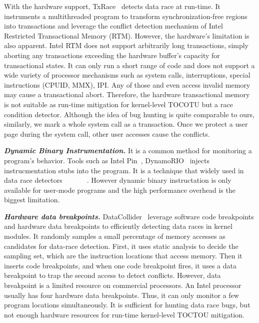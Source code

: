 With the hardware support, TxRace~\cite{zhang2016txrace} detects data race at run-time. It instruments a multithreaded program to transform synchronization-free regions into transactions and leverage the conflict detection mechanism of Intel Restricted Transactional Memory (RTM). However, the hardware's limitation is also apparent.  Intel RTM does not support arbitrarily long transactions, simply aborting any transactions exceeding the hardware buffer's capacity for transactional states. It can only run a short range of code and does not support a wide variety of processor mechanisms such as system calls, interruptions, special instructions (CPUID, MMX), IPI. Any of those and even access invalid memory may cause a transactional abort. Therefore, the hardware transactional memory is not suitable as run-time mitigation for kernel-level TOCOTU but a race condition detector. Although the idea of bug hunting is quite comparable to ours, similarly, we mark a whole system call as a transaction. Once we protect a user page during the system call, other user accesses cause the conflicts. 




\textbf{\textit{Dynamic Binary Instrumentation.}}  It is a common method for monitoring a program's behavior. Tools such as Intel Pin~\cite{luk2005pin}, DynamoRIO~\cite{nethercote2007valgrind} injects instrucmentation stubs into the program. It is a technique that widely used in data race detectors~\cite{savage1997eraser}~\cite{o2003hybrid}~\cite{yu2005racetrack}~\cite{bond2010pacer}~\cite{marino2009literace}~\cite{flanagan2009fasttrack}~\cite{pozniansky2007multirace}. However dynamic binary instructation is only available for user-mode programs and the high performance overhead is the biggest limitation. 


\textbf{\textit{Hardware data breakpoints.}} DataCollider~\cite{erickson2010effective} leverage software code breakpoints and hardware data breakpoints to efficiently detecting data races in kernel modules.  It randomly samples a small percentage of memory accesses as candidates for data-race detection. First, it uses static analysis to decide the sampling set, which are the instruction locations that access memory. Then it inserts code breakpoints, and when one code breakpoint fires, it uses a data breakpoint to trap the second access to detect conflicts. However, data breakpoint is a limited resource on commercial processors. An Intel processor usually has four hardware data breakpoints. Thus, it can only monitor a few program locations simultaneously. It is sufficient for hunting data race bugs, but not enough hardware resources for run-time kernel-level TOCTOU mitigation.

